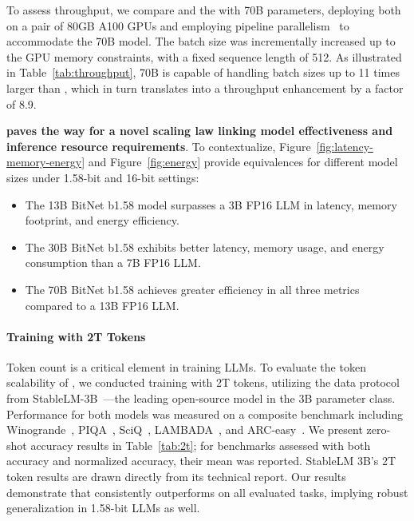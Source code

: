 To assess throughput, we compare  and the  with 70B parameters, deploying both on a pair of 80GB A100 GPUs and employing pipeline parallelism~\cite{gpipe} to accommodate the  70B model. The batch size was incrementally increased up to the GPU memory constraints, with a fixed sequence length of 512. As illustrated in Table~\ref{tab:throughput},  70B is capable of handling batch sizes up to 11 times larger than , which in turn translates into a throughput enhancement by a factor of 8.9.

\textbf{ paves the way for a novel scaling law linking model effectiveness and inference resource requirements}. To contextualize, Figure~\ref{fig:latency-memory-energy} and Figure~\ref{fig:energy} provide equivalences for different model sizes under 1.58-bit and 16-bit settings:

\begin{itemize}
    \item The 13B BitNet b1.58 model surpasses a 3B FP16 LLM in latency, memory footprint, and energy efficiency.
    \item The 30B BitNet b1.58 exhibits better latency, memory usage, and energy consumption than a 7B FP16 LLM.
    \item The 70B BitNet b1.58 achieves greater efficiency in all three metrics compared to a 13B FP16 LLM.
\end{itemize}

\paragraph{Training with 2T Tokens}

Token count is a critical element in training LLMs. To evaluate the token scalability of , we conducted training with 2T tokens, utilizing the data protocol from StableLM-3B~\cite{StableLM-3B-4E1T}—the leading open-source model in the 3B parameter class. Performance for both models was measured on a composite benchmark including Winogrande~\cite{winoGrande}, PIQA~\cite{piqa}, SciQ~\cite{sciq}, LAMBADA~\cite{lambada}, and ARC-easy~\cite{arc}. We present zero-shot accuracy results in Table~\ref{tab:2t}; for benchmarks assessed with both accuracy and normalized accuracy, their mean was reported. StableLM 3B's 2T token results are drawn directly from its technical report. Our results demonstrate that  consistently outperforms on all evaluated tasks, implying robust generalization in 1.58-bit LLMs as well.

